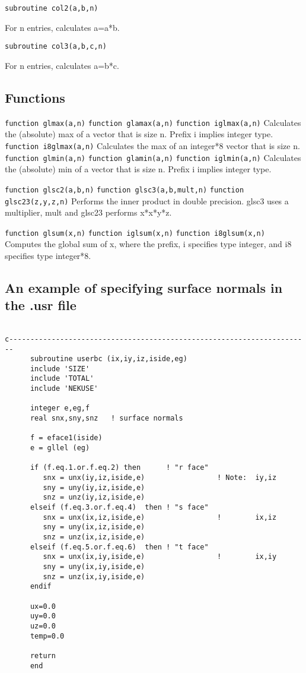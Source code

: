{\tt subroutine col2(a,b,n)}

    For n entries, calculates a=a*b. 
    
{\tt subroutine col3(a,b,c,n)}

    For n entries, calculates a=b*c. 
\subsection{Functions}

{\tt function glmax(a,n)}
{\tt function glamax(a,n)}
{\tt function iglmax(a,n)}
    Calculates the (absolute) max of a vector that is size n. Prefix i implies integer type. 
{\tt function i8glmax(a,n)}
    Calculates the max of an integer*8 vector that is size n. 
{\tt function glmin(a,n)}
{\tt function glamin(a,n)}
{\tt function iglmin(a,n)}
    Calculates the (absolute) min of a vector that is size n. Prefix i implies integer type. 


{\tt function glsc2(a,b,n)}
{\tt function glsc3(a,b,mult,n)}
{\tt function glsc23(z,y,z,n)}
    Performs the inner product in double precision. glsc3 uses a multiplier, mult and glsc23 performs x*x*y*z. 


{\tt function glsum(x,n)}
{\tt function iglsum(x,n)}
{\tt function i8glsum(x,n)}
    Computes the global sum of x, where the prefix, i specifies type integer, and i8 specifies type integer*8. 

\subsection{An example of specifying surface normals in the .usr file}
\begin{verbatim}

c-----------------------------------------------------------------------
      subroutine userbc (ix,iy,iz,iside,eg)
      include 'SIZE'
      include 'TOTAL'
      include 'NEKUSE'

      integer e,eg,f
      real snx,sny,snz   ! surface normals

      f = eface1(iside)
      e = gllel (eg)

      if (f.eq.1.or.f.eq.2) then      ! "r face"
         snx = unx(iy,iz,iside,e)                 ! Note:  iy,iz
         sny = uny(iy,iz,iside,e)
         snz = unz(iy,iz,iside,e)
      elseif (f.eq.3.or.f.eq.4)  then ! "s face"
         snx = unx(ix,iz,iside,e)                 !        ix,iz
         sny = uny(ix,iz,iside,e)
         snz = unz(ix,iz,iside,e)
      elseif (f.eq.5.or.f.eq.6)  then ! "t face"
         snx = unx(ix,iy,iside,e)                 !        ix,iy
         sny = uny(ix,iy,iside,e)
         snz = unz(ix,iy,iside,e)
      endif

      ux=0.0
      uy=0.0
      uz=0.0
      temp=0.0

      return
      end
\end{verbatim}  

